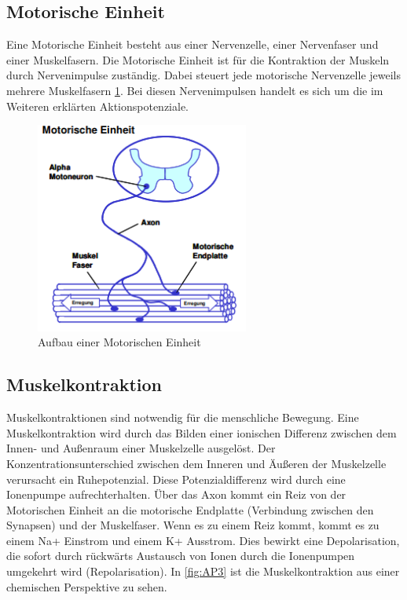 \subsection{Motorische Einheit}

Eine Motorische Einheit \cite{MorSteMer2004-ATO} besteht aus einer Nervenzelle, einer Nervenfaser und einer Muskelfasern. Die Motorische Einheit ist für die Kontraktion der Muskeln durch Nervenimpulse zuständig. Dabei steuert jede motorische Nervenzelle jeweils mehrere Muskelfasern \ref{fig:muskel2}. Bei diesen Nervenimpulsen handelt es sich um die im Weiteren erklärten Aktionspotenziale.

\begin{figure}[H]
  \centering
  \includegraphics[width=70mm,scale=0.7]{MotorUnit.png}
  \caption{Aufbau einer Motorischen Einheit  \cite{KonEMG2006-ATO}}
  \label{fig:muskel2}
\end{figure}

\clearpage

\subsection{Muskelkontraktion}
Muskelkontraktionen sind notwendig für die menschliche Bewegung. 
Eine Muskelkontraktion \cite{MorSteMer2004-ATO} wird durch das Bilden einer ionischen Differenz zwischen dem Innen- und Außenraum einer Muskelzelle ausgelöst. Der Konzentrationsunterschied zwischen dem Inneren und Äußeren der Muskelzelle verursacht ein 
Ruhepotenzial.
Diese Potenzialdifferenz wird durch eine Ionenpumpe aufrechterhalten. Über das Axon kommt ein Reiz von der Motorischen Einheit an die motorische Endplatte (Verbindung zwischen den Synapsen) und der Muskelfaser. Wenn es zu einem Reiz kommt, kommt es zu einem Na+ Einstrom und einem K+ Ausstrom. Dies bewirkt eine Depolarisation, die sofort durch rückwärts Austausch von Ionen durch die Ionenpumpen umgekehrt wird
(Repolarisation). In \ref{fig:AP3} ist die Muskelkontraktion aus einer chemischen Perspektive zu sehen.


